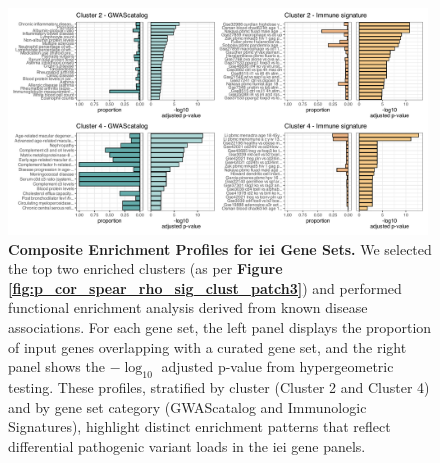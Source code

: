 \begin{figure}[ht]
\centering
\includegraphics[width=0.99\textwidth]{../images/fuma_merge.pdf}
\caption{\textbf{Composite Enrichment Profiles for \ac{iei} Gene Sets.} 
We selected the top two enriched clusters (as per \textbf{Figure \ref{fig:p_cor_spear_rho_sig_clust_patch3}}) and performed functional enrichment analysis derived from known disease associations. For each gene set, the left panel displays the proportion of input genes overlapping with a curated gene set, and the right panel shows the \(-\log_{10}\) adjusted p-value from hypergeometric testing. These profiles, stratified by cluster (Cluster 2 and Cluster 4) and by gene set category (GWAScatalog and Immunologic Signatures), highlight distinct enrichment patterns that reflect differential pathogenic variant loads in the \ac{iei} gene panels.}
\label{fig:fuma_merge}
\end{figure}

